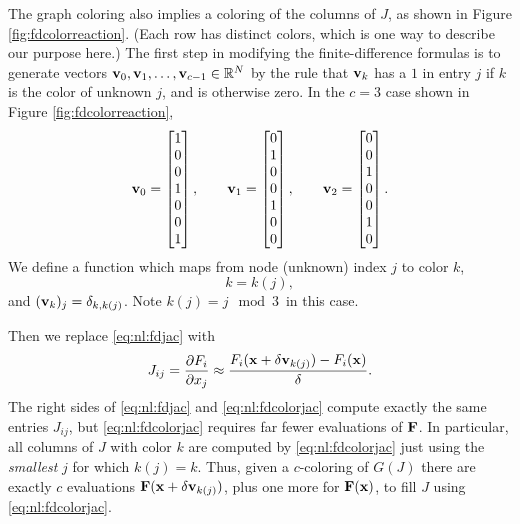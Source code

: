 The graph coloring also implies a coloring of the columns of $J$, as shown in Figure \ref{fig:fdcolorreaction}.  (Each row has distinct colors, which is one way to describe our purpose here.)  The first step in modifying the finite-difference formulas is to generate vectors $\mathbf{v}_0, \mathbf{v}_1, \dots, \mathbf{v}_{c-1} \in \mathbb{R}^N$ by the rule that $\mathbf{v}_k$ has a $1$ in entry $j$ if $k$ is the color of unknown $j$, and is otherwise zero.  In the $c=3$ case shown in Figure \ref{fig:fdcolorreaction},
\begin{equation}
\mathbf{v}_0 = \begin{bmatrix} 1 \\ 0 \\ 0 \\ 1 \\ 0 \\ 0 \\ 1 \end{bmatrix}, \qquad
\mathbf{v}_1 = \begin{bmatrix} 0 \\ 1 \\ 0 \\ 0 \\ 1 \\ 0 \\ 0 \end{bmatrix}, \qquad
\mathbf{v}_2 = \begin{bmatrix} 0 \\ 0 \\ 1 \\ 0 \\ 0 \\ 1 \\ 0 \end{bmatrix}.
 \label{eq:nl:coloringvecs}
\end{equation}
We define a function which maps from node (unknown) index $j$ to color $k$,
\begin{equation}
k = k(j),  \label{eq:nl:colorfunc}
\end{equation}
and $(\mathbf{v}_k)_j = \delta_{k,k(j)}$.  Note $k(j) = j\mod 3$\, in this case.

Then we replace \eqref{eq:nl:fdjac} with
\begin{equation}
J_{ij} = \frac{\partial F_i}{\partial x_j} \approx \frac{F_i(\mathbf{x}+\delta \mathbf{v}_{k(j)}) - F_i(\mathbf{x})}{\delta}.  \label{eq:nl:fdcolorjac}
\end{equation}
The right sides of \eqref{eq:nl:fdjac} and \eqref{eq:nl:fdcolorjac} compute exactly the same entries $J_{ij}$, but \eqref{eq:nl:fdcolorjac} requires far fewer evaluations of $\mathbf{F}$.  In particular, all columns of $J$ with color $k$ are computed by \eqref{eq:nl:fdcolorjac} just using the \emph{smallest} $j$ for which $k(j)=k$.  Thus, given a $c$-coloring of $G(J)$ there are exactly $c$ evaluations $\mathbf{F}(\mathbf{x}+\delta \mathbf{v}_{k(j)})$, plus one more for $\mathbf{F}(\mathbf{x})$, to fill $J$ using \eqref{eq:nl:fdcolorjac}.

